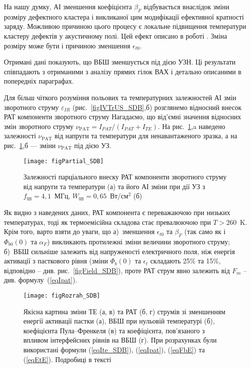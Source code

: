 На нашу думку, АІ зменшення коефіцієнта $\beta_F$ відбувається внаслідок зміни розміру дефектного кластера і викликаної цим
модифікації ефективної кратності заряду.
Можливою причиною цього процесу є локальне підвищення температури кластеру дефектів у акустичному полі.
Цей ефект описано в роботі \cite{MirzadeJAP2011}.
Зміна розміру може бути і причиною зменшення $\epsilon_{t0}$.

Отримані дані показують, що ВБШ зменшується під дією УЗН.
Ці результати співпадають з отриманими з аналізу прямих гілок ВАХ і детально описаними в попередніх параграфах.

Для більш чіткого розуміння польових та температурних залежностей АІ змін зворотного струму $\varepsilon_{IR}$ (рис.~\ref{figIVTrUS_SDB},б)
розглянемо відносний внесок РАТ компоненти зворотного струму
Нагадаємо, що від'ємні значення відносних змін зворотного струму
$\nu_\mathrm{PAT}=I_{P\!AT}/(I_{P\!AT}+I_{TE})$.
На рис.~\ref{figPartial_SDB},a наведено залежності $\nu_\mathrm{PAT}$ від напруги та температури для ненавантаженого зразка,
а на рис.~\ref{figPartial_SDB},б --- зміни $\nu_\mathrm{PAT}$ під дією УЗ.


\begin{figure}
\center
\texttt{[image: figPartial\_SDB]}
\caption{\label{figPartial_SDB}
Залежності парціального внеску РАТ компоненти зворотного струму від напруги та температури (а)
та його АІ зміни при дії УЗ з $f_\mathtt{US}=4,1$~МГц, $W_\mathtt{US}=0,65$~Вт/см$^2$ (б)
}%
\end{figure}

Як видно з наведених даних, РАТ компонента є переважаючою при низьких температурах, тоді як термоемісійна складова стає превалюючою при $T>260$~K.
Крім того, варто взяти до уваги, що
а)~зменшення $\epsilon_{t0}$ та $\beta_F$ (так само як і $\Phi_{b0}(0)$ та $\alpha_F$) викликають протилежні зміни величини зворотного струму;
б)~ВБШ сильніше залежить від напруженості електричного поля, ніж енергія активації з пасткового рівня
(зміни $\Phi_{b}(0)$ та $\epsilon_t$ складають 25\% та 15\%, відповідно -- див. рис.~\ref{figField_SDB}),
проте РАТ струм явно залежить від $F_m$ -- див. формулу~(\ref{eqIpat}).



\begin{figure}
\center
\texttt{[image: figRozrah\_SDB]}
\caption{\label{figRozrah_SDB}
Якісна картина зміни ТЕ (а, в) та РАТ (б, г) струмів зі зменшенням енергії активації пастки (а),
ВБШ при нульовій температурі (б),
коефіцієнта Пула--Френкеля (в)
та коефіцієнта, пов'язаного з впливом інтерфейсних рівнів на ВБШ (г).
При розрахунках були використані формули (\ref{eqIte_SDB}), (\ref{eqIpat}), (\ref{eqFbE}) та (\ref{eqEtE}).
Подробиці в тексті
}%
\end{figure}

